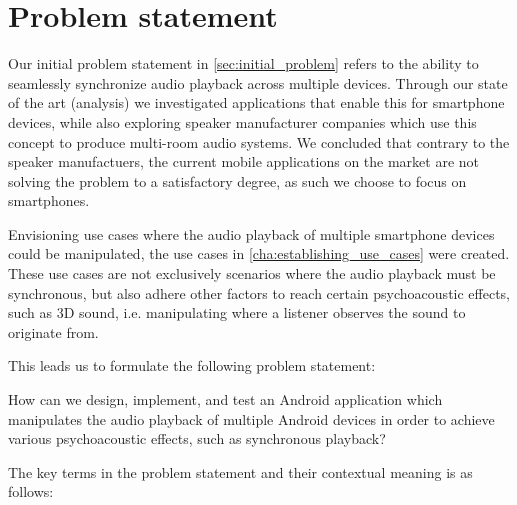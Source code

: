 \chapter{Problem statement}
Our initial problem statement in \cref{sec:initial_problem} refers to the ability to seamlessly synchronize audio playback across multiple devices.
Through our state of the art (analysis) we investigated applications that enable this for smartphone devices, while also exploring speaker manufacturer companies which use this concept to produce multi-room audio systems. 
We concluded that contrary to the speaker manufactuers, the current mobile applications on the market are not solving the problem to a satisfactory degree, as such we choose to focus on smartphones.

Envisioning use cases where the audio playback of multiple smartphone devices could be manipulated, the use cases in \cref{cha:establishing_use_cases} were created.
These use cases are not exclusively scenarios where the audio playback must be synchronous, but also adhere other factors to reach certain psychoacoustic effects, such as 3D sound, i.e. manipulating where a listener observes the sound to originate from.

This leads us to formulate the following problem statement:

\begin{problemstatement}
    How can we design, implement, and test an Android application which manipulates the audio playback of multiple Android devices in order to achieve various psychoacoustic effects, such as synchronous playback?
\end{problemstatement}

The key terms in the problem statement and their contextual meaning is as follows:

